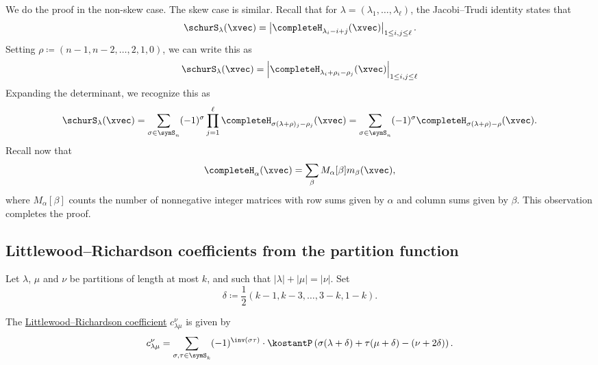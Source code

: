 \begin{proof*}
We do the proof in the non-skew case. The skew case is similar.
Recall that for $\lambda = (\lambda_1,\dotsc,\lambda_\ell)$,
the Jacobi--Trudi identity states that
\begin{equation}
 \schurS_\lambda(\xvec) = 
 \left| \completeH_{\lambda_i - i + j}(\xvec) \right|_{1 \leq i,j \leq \ell} .
\end{equation}
Setting $\rho \coloneqq (n-1,n-2,\dotsc,2,1,0)$,
we can write this as
\begin{equation}
 \schurS_\lambda(\xvec) = 
 \left| \completeH_{\lambda_i + \rho_i - \rho_j}(\xvec) \right|_{1 \leq i,j \leq \ell}
\end{equation}
Expanding the determinant, we recognize this as
\begin{equation}
 \schurS_\lambda(\xvec)
   = \sum_{\sigma \in \symS_n}
   (-1)^\sigma \prod_{j=1}^{\ell} \completeH_{\sigma(\lambda+\rho)_j - \rho_j}(\xvec)
   = \sum_{\sigma \in \symS_n}
   (-1)^\sigma \completeH_{\sigma(\lambda+\rho) - \rho}(\xvec).
\end{equation}
Recall now that 
\[
  \completeH_\alpha(\xvec) = \sum_{\beta} M_\alpha[\beta] m_\beta(\xvec),
\]
where $M_\alpha[\beta]$ counts the number of nonnegative integer
matrices with row sums given by $\alpha$ and column sums given by $\beta$.
This observation completes the proof.
\end{proof*}

\subsection[littlewoodRichardsonFromKostant]{Littlewood--Richardson coefficients from the partition function}


Let $\lambda$, $\mu$ and $\nu$ be partitions of length at most $k$,
and such that $|\lambda|+|\mu| = |\nu|$.
Set
\[
\delta \coloneqq \frac{1}{2}(k-1,k-3,\dotsc,3-k,1-k).
\]

\begin{theorem}
\label{steinbergFormula}
The \hyperref[littlewoodRichardsonModels]{Littlewood--Richardson coefficient}
$c^{\nu}_{\lambda \mu}$ is given by
\[
c^{\nu}_{\lambda \mu} =
\sum_{\sigma, \tau \in \symS_k} (-1)^{\inv(\sigma \tau)}
\cdot
\kostantP\left(
\sigma(\lambda+\delta)
+
\tau(\mu+\delta)
-
(\nu+2\delta)
\right).
\]
\end{theorem}


